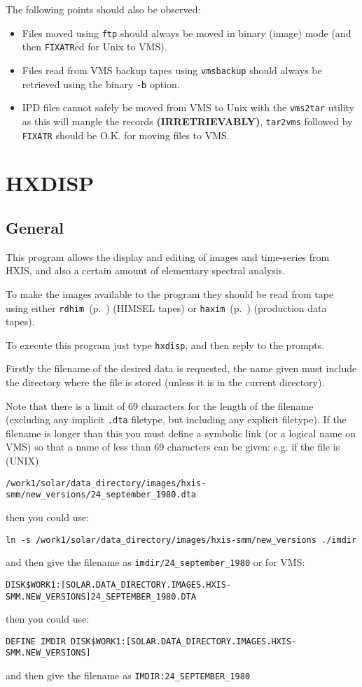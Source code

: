 The following points should also be observed:
\begin{itemize}
\item Files moved using \verb!ftp! should always be moved in binary (image)
mode (and then \verb!FIXATR!ed for Unix to VMS).
\item Files read from VMS backup tapes using \verb!vmsbackup! should
always be retrieved using the binary \verb!-b! option.
\item IPD files cannot safely be moved from VMS to Unix with the
\verb!vms2tar! utility as this will mangle the records {\bf
(IRRETRIEVABLY)}, \verb!tar2vms!
followed by \verb!FIXATR! should be O.K. for moving files to VMS.
\end{itemize}


\section{HXDISP}
\label{HXDISP}

\subsection{General}

This program allows the display and editing of images and time-series
from HXIS, and also a certain amount of elementary spectral analysis.

To make the images available to the program they should be read from
tape using either \verb!rdhim!~(p.~\pageref{RDHIM}) (HIMSEL tapes) or
\verb!haxim!~(p.~\pageref{HAXIM}) (production data tapes).

To execute this program just type \verb!hxdisp!, and then reply to the
prompts.

Firstly the filename of the desired data is requested, the name given
must include the directory where the file is stored (unless it is in
the current directory).

Note that there is a limit of 69
\label{longname} characters for the length of the filename (excluding any
implicit {\tt .dta} filetype, but including any explicit filetype).  If
the filename is longer than this you must define a symbolic link (or a
logical name on VMS) so that a name of less than 69 characters can be
given: e.g. if the file is (UNIX)
\begin{verbatim}
/work1/solar/data_directory/images/hxis-smm/new_versions/24_september_1980.dta
\end{verbatim}
then you could use:
\begin{verbatim}
ln -s /work1/solar/data_directory/images/hxis-smm/new_versions ./imdir
\end{verbatim}
and then give the filename as \verb!imdir/24_september_1980! or for VMS:
\begin{verbatim}
DISK$WORK1:[SOLAR.DATA_DIRECTORY.IMAGES.HXIS-SMM.NEW_VERSIONS]24_SEPTEMBER_1980.DTA
\end{verbatim}
then you could use:
\begin{verbatim}
DEFINE IMDIR DISK$WORK1:[SOLAR.DATA_DIRECTORY.IMAGES.HXIS-SMM.NEW_VERSIONS]
\end{verbatim}
and then give the filename as \verb!IMDIR:24_SEPTEMBER_1980!

